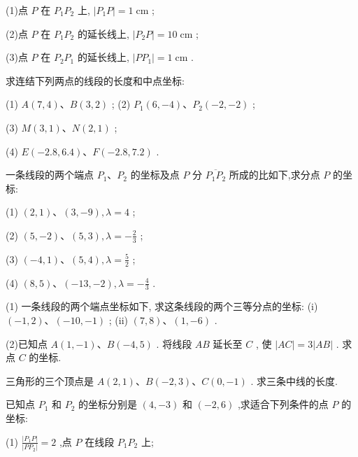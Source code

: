 \documentclass[lang=cn,newtx,12pt,scheme=chinese]{elegantbook}
\begin{document}
\begin{problemset}[习 题 一]
(1)点 \(P\) 在 \({P}_{1}{P}_{2}\) 上, \(\left| {{P}_{1}P}\right| = 1\mathrm{\;{cm}}\) ;

(2)点 \(P\) 在 \({P}_{1}{P}_{2}\) 的延长线上, \(\left| {{P}_{2}P}\right| = {10}\mathrm{\;{cm}}\) ;

(3)点 \(P\) 在 \({P}_{2}{P}_{1}\) 的延长线上, \(\left| {P{P}_{1}}\right| = 1\mathrm{\;{cm}}\) .

\item 求连结下列两点的线段的长度和中点坐标:

(1) \(A\left( {7,4}\right) \text{、}B\left( {3,2}\right)\) ; (2) \({P}_{1}\left( {6, - 4}\right) \text{、}{P}_{2}\left( {-2, - 2}\right)\) ;

(3) \(M\left( {3,1}\right) \text{、}N\left( {2,1}\right)\) ;

(4) \(E\left( {-{2.8},{6.4}}\right) \text{、}F\left( {-{2.8},{7.2}}\right)\) .

\item 一条线段的两个端点 \({P}_{1}\text{、}{P}_{2}\) 的坐标及点 \(P\) 分 \(\overline{{P}_{1}{P}_{2}}\) 所成的比如下,求分点 \(P\) 的坐标:

(1) \(\left( {2,1}\right) \text{、}\left( {3, - 9}\right) ,\lambda = 4\) ;

(2) \(\left( {5, - 2}\right) \text{、}\left( {5,3}\right) ,\lambda = - \frac{2}{3}\) ;

(3) \(\left( {-4,1}\right) \text{、}\left( {5,4}\right) ,\lambda = \frac{5}{2}\) ;

(4) \(\left( {8,5}\right) \text{、}\left( {-{13}, - 2}\right) ,\lambda = - \frac{4}{3}\) .

\item (1) 一条线段的两个端点坐标如下, 求这条线段的两个三等分点的坐标: (i) \(\left( {-1,2}\right) \text{、}\left( {-{10}, - 1}\right)\) ; (ii) \(\left( {7,8}\right) \text{、}\left( {1, - 6}\right)\) .

(2)已知点 \(A\left( {1, - 1}\right) \text{、}B\left( {-4,5}\right)\) . 将线段 \({AB}\) 延长至 \(C\) , 使 \(\left| {AC}\right| = 3\left| {AB}\right|\) . 求点 \(C\) 的坐标.

\item 三角形的三个顶点是 \(A\left( {2,1}\right) \text{、}B\left( {-2,3}\right) \text{、}C\left( {0, - 1}\right)\) . 求三条中线的长度.

\item 已知点 \({P}_{1}\) 和 \({P}_{2}\) 的坐标分别是 \(\left( {4, - 3}\right)\) 和 \(\left( {-2,6}\right)\) ,求适合下列条件的点 \(P\) 的坐标:

(1) \(\frac{\left| {P}_{1}P\right| }{\left| P{P}_{2}\right| } = 2\) ,点 \(P\) 在线段 \({P}_{1}{P}_{2}\) 上;


\end{problemset}
\end{document}
